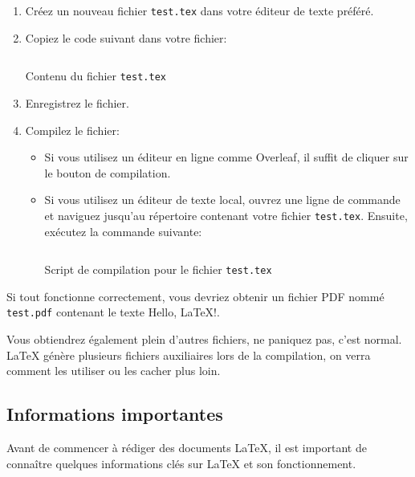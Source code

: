 \begin{enumerate}
    \item Créez un nouveau fichier \texttt{test.tex} dans votre éditeur de texte préféré.
    \item Copiez le code suivant dans votre fichier:
\begin{listing}[!htb]
\inputminted[frame=single,framesep=4pt,breaklines]{latex}{./2_Installation/test.tex}
\caption{Contenu du fichier \texttt{test.tex}}\label{lst:test_file}
\end{listing}
    \item Enregistrez le fichier.
    \item Compilez le fichier:
    \begin{itemize}
        \item Si vous utilisez un éditeur en ligne comme Overleaf, il suffit de cliquer sur le bouton de compilation.
        \item Si vous utilisez un éditeur de texte local, ouvrez une ligne de commande et naviguez jusqu'au répertoire contenant votre fichier \texttt{test.tex}.
        Ensuite, exécutez la commande suivante:
\begin{listing}[!htb]
\begin{tcolorbox}[coltext=terminalwhite, colback=terminalblack, colframe=terminalwhite, boxrule=0pt, sharp corners=all]
\inputminted[breaklines]{bash}{./2_Installation/compile_test.sh}
\end{tcolorbox}
\caption{Script de compilation pour le fichier \texttt{test.tex}}\label{lst:compile_test_script}
\end{listing}
    \end{itemize}
\end{enumerate}

Si tout fonctionne correctement, vous devriez obtenir un fichier PDF nommé \texttt{test.pdf} contenant le texte \og{}Hello, \LaTeX!\fg{}.

Vous obtiendrez également plein d'autres fichiers, ne paniquez pas, c'est normal.
LaTeX génère plusieurs fichiers auxiliaires lors de la compilation, on verra comment les utiliser ou 
les cacher plus loin.

\subsection{Informations importantes}\label{subsec:important_info}
Avant de commencer à rédiger des documents LaTeX, il est important de connaître quelques informations clés sur LaTeX et son fonctionnement.

